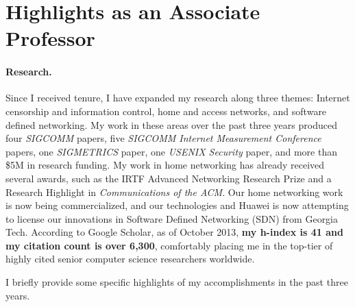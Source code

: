 \section*{Highlights as an Associate Professor}

\paragraph{Research.}  Since I received tenure, I have expanded my
research along three themes: Internet censorship and information
control, home and access networks, and software defined networking.  My
work in these areas over the past three years produced four {\em
SIGCOMM} papers, five {\em SIGCOMM Internet Measurement Conference}
papers, one {\em SIGMETRICS} paper, one {\em USENIX Security} paper, and
more than \$5M in research funding.  My work in home networking has
already received several awards, such as the IRTF Advanced Networking
Research Prize and a Research Highlight in {\em Communications of the
ACM}.  Our home networking work is now being commercialized, and our
technologies and Huawei is now attempting to license our innovations in
Software Defined Networking (SDN) from Georgia Tech.  According to
Google Scholar, as of October 2013, {\bf my h-index is 41 and my
citation count is over 6,300}, comfortably placing me in the top-tier of
highly cited senior computer science researchers worldwide.

I briefly provide some specific highlights of my accomplishments in the
past three years.

